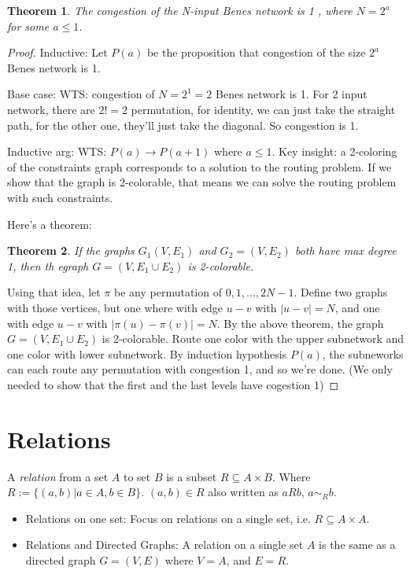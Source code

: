 \documentclass[10pt]{article}
\newcounter{set}
\newcommand{\ra}{\rightarrow}
\newtheorem{theorem}{Theorem}[subsection]
\begin{document}
\begin{theorem}
  The congestion of the N-input Benes network is 1 , where $N=2^a$ for
  some $a\le 1$.
\end{theorem}
\begin{proof}
Inductive:  Let $P(a)$ be the proposition that congestion of the size $2^a$
  Benes network is 1.

Base case: WTS: congestion of $N=2^1 = 2$ Benes network is 1. For 2
input network, there are $2!=2$ permutation, for identity, we can just
take the straight path, for the other one, they'll just take the
diagonal. So congestion is 1.

Inductive arg: WTS: $P(a) \ra P(a+1)$ where $a\le 1$. Key insight: a
2-coloring of the constraints graph corresponds to a solution to the
routing problem. If we show that the graph is 2-colorable, that means
we can solve the routing problem with such constraints.

Here's a theorem:
\begin{theorem}
  If the graphs $G_1(V, E_1)$ and $G_2 = (V, E_2)$ both have max
  degree 1, then th egraph $G = (V, E_1\cup E_2)$ is \emph{2-colorable}.
\end{theorem}

Using that idea, let $\pi$ be any permutation of ${0, 1, \dots,
  2N-1}$. Define two graphs with those vertices, but one where with edge $u-v$ with $|u-v|=N$,
and one with edge $u-v$ with $|\pi(u)-\pi(v)| = N$. By the above
theorem, the graph $G=(V, E_1\cup E_2)$ is 2-colorable. Route one
color with the upper subnetwork and one color with lower
subnetwork. By induction hypothesis $P(a)$, the subneworks can each
route any permutation with congestion 1, and so we're done. (We only needed to show that
the first and the last levels have cogestion 1)
\end{proof}

\section{Relations}
A \emph{relation} from a set $A$ to set $B$ is a subset $R\subseteq
A\times B$. Where $R:= \{ (a,b)| a\in A, b\in B\}$. $(a,b)\in R$ also
written as $aRb$, $a\sim_Rb$.

\begin{itemize}
\item Relations on one set: Focus on relations on a single set, i.e. $R\subseteq A\times A$.
\item Relations and Directed Graphs: A relation on a single set $A$ is
  the same as a directed graph $G=(V, E)$ where $V=A$, and $E=R$.
\end{itemize}
\end{document}
